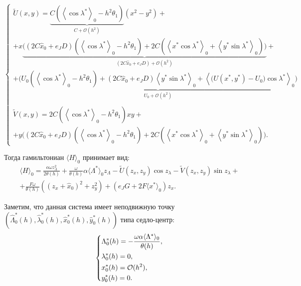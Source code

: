 \begin{equation*}
    \begin{cases}
        \tilde U (x,y) = \underbrace{C \left( \left\langle \cos \lambda^* \right\rangle_0 - h^2 \theta_1 \right)}_{C+\mathcal{O}(h^2)} (x^2-y^2) + \\ +x \underbrace{\big( (2C \hat x_0 + e_J D)\left( \left\langle \cos \lambda^* \right\rangle_0 - h^2 \theta_1 \right) + 2C \left( \left\langle x^* \cos \lambda^* \right\rangle_0 + \left\langle y^* \sin \lambda^* \right\rangle_0 \right) \big)}_{(2C \hat x_0 + e_J D)+\mathcal{O}(h^2)} + \\ + \underbrace{\big( U_0 \left( \left\langle \cos \lambda^* \right\rangle_0 - h^2 \theta_1 \right) + (2C \hat x_0 + e_J D) \left\langle y^* \sin \lambda^* \right\rangle_0 + \left\langle \big( U(x^*,y^*) - U_0 \big) \cos \lambda^* \right\rangle_0 \big)}_{U_0 + \mathcal{O}(h^2)} \\
        \\
        \tilde V(x,y) = 2C\left( \left\langle \cos \lambda^* \right\rangle_0 - h^2 \theta_1 \right) xy + \\ + y \big( (2C \hat x_0 + e_J D)\left( \left\langle \cos \lambda^* \right\rangle_0 - h^2 \theta_1 \right) + 2C \left( \left\langle x^* \cos \lambda^* \right\rangle_0 + \left\langle y^* \sin \lambda^* \right\rangle_0 \right) \big).
    \end{cases}
\end{equation*} 


Тогда гамильтониан $\langle H \rangle_0$ принимает вид:
\begin{multline*}
\langle H \rangle_0 = \frac{\alpha \omega z_\Lambda^2}{2 \theta(h)} + \frac{\omega}{\theta(h)}\alpha \langle \Lambda^* \rangle_0 z_\Lambda - \tilde U(z_x,z_y)\cos{z_\lambda} - \tilde V(z_x,z_y)\sin{z_\lambda} + \\ +\frac{F \omega}{\theta(h)} \left((z_x+\hat x_0)^2+z_y^2 \right) + (e_J G + 2F \langle x^* \rangle_0) z_x.
\label{avg_ham2}
\end{multline*}

Заметим, что данная система имеет неподвижную точку $(\hat \Lambda_0^*(h),\hat \lambda_0^*(h), \hat x_0^*(h), \hat y_0^*(h))$ типа седло-центр:
\begin{equation}
\begin{dcases}
\Lambda_0^*(h) = - \frac{\omega \alpha \langle \Lambda^* \rangle_0}{\theta(h)}, \\
\lambda_0^*(h) = 0,\\
x_0^*(h) = \mathcal{O}(h^2),\\
y_0^*(h) = 0.
\end{dcases}
\end{equation}

